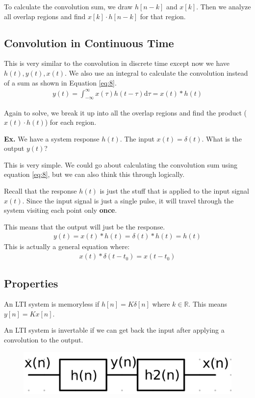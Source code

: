 \documentclass[12pt,letterpaper]{article} \usepackage{amsmath} \usepackage{graphicx} \usepackage[margin=1in]{geometry} \usepackage{longtable}  \usepackage{amssymb}
\begin{document}
	To calculate the convolution sum, we draw $h[n-k]$ and $x[k]$. Then we analyze all overlap regions and find $x[k]\cdot h[n-k]$ for that region. 
	
	\subsection{Convolution in Continuous Time}
	This is very similar to the convolution in discrete time except now we have $h(t), y(t), x(t)$. We also use an integral to calculate the convolution instead of a sum as shown in Equation \ref{eq:8}.
	\begin{align}
		y(t)=\int^{\infty}_{-\infty} x(\tau)h(t-\tau)\mathrm d\tau = x(t)*h(t)\label{eq:8}
	\end{align}
	
	Again to solve, we break it up into all the overlap regions and find the product ($x(t)\cdot h(t)$) for each region.
	
	\begin{mdframed}
		\textbf{Ex.} We have a system response $h(t)$. The input $x(t) = \delta(t)$. What is the output $y(t)$?
		
		This is very simple. We could go about calculating the convolution sum using equation \ref{eq:8}, but we can also think this through logically. 
		
		Recall that the response $h(t)$ is just the stuff that is applied to the input signal $x(t)$. Since the input signal is just a single pulse, it will travel through the system visiting each point only \textbf{once}. 
		
		This means that the output will just be the response. 
		\begin{align*}
			y(t) = x(t) * h(t) = \delta(t) * h(t) = h(t)
		\end{align*}
		This is actually a general equation where:
		\begin{align}
			x(t)*\delta(t-t_0) = x(t-t_0)
		\end{align}
	\end{mdframed}
	
	\subsection{Properties}
	An LTI system is memoryless if $h[n] = K\delta[n]$ where $k \in \mathbb R$. This means $y[n] = Kx[n]$.
	
	An LTI system is invertable if we can get back the input after applying a convolution to the output. 
	\begin{figure}[H]
		\centering
		\includegraphics[width=0.4\linewidth]{images/invertability}
		\label{fig:invertability}
	\end{figure}
	
\end{document}
